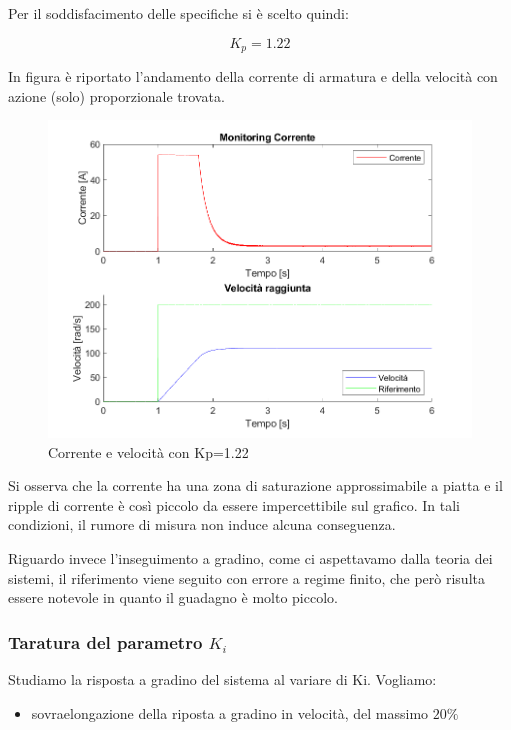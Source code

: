 \documentclass[a4paper,12pt]{article}
\begin{document}
Per il soddisfacimento delle specifiche si è scelto quindi:

\[
    K_p = 1.22
\]

In figura è riportato l'andamento della corrente di armatura e della velocità con azione (solo) proporzionale trovata.

\begin{figure}[h!]
    \centering
    \includegraphics[scale = 0.6]{Immagini/PlotMatlab/controlloSoloProporzionale.png}
    \caption{Corrente e velocità con Kp=1.22}
    \label{fig:kpscelto}
\end{figure}

\vspace{0.5cm}

Si osserva che la corrente ha una zona di saturazione approssimabile a piatta e il ripple di corrente è così piccolo da essere impercettibile sul grafico.
In tali condizioni, il rumore di misura non induce alcuna conseguenza.

Riguardo invece l'inseguimento a gradino, come ci aspettavamo dalla teoria dei sistemi, il riferimento viene seguito con errore a regime finito, che però risulta essere notevole in quanto il guadagno è molto piccolo.


\subsubsection{Taratura del parametro $K_i$}

Studiamo la risposta a gradino del sistema al variare di Ki.  Vogliamo:

\begin{itemize}
    \item sovraelongazione della riposta a gradino in velocità, del massimo $20\%$
\end{itemize}
\end{document}
